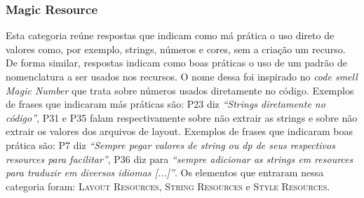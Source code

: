 \subsubsection{Magic Resource}

Esta categoria re\'une respostas que indicam como m\'a pr\'atica o uso direto de valores como, por exemplo, strings, números e cores, sem a criação um recurso. De forma similar, respostas indicam como boas pr\'aticas o uso de um padr\~ao de nomenclatura a ser usados nos recursos. O nome dessa foi inspirado no \textit{code smell} \textit{Magic Number} \cite{Martin:2008:CCH:1388398} que trata sobre números usados diretamente no código. Exemplos de frases que indicaram m\'as pr\'aticas s\~ao: P23 diz \textit{``Strings diretamente no código''}, P31 e P35 falam respectivamente sobre não extrair as strings e sobre não extrair os valores dos arquivos de layout. Exemplos de frases que indicaram boas pr\'atica s\~ao: P7 diz \textit{``Sempre pegar valores de string ou dp de seus respectivos resources para facilitar''}, P36 diz para \textit{``sempre adicionar as strings em resources para traduzir em diversos idiomas [...]''}. Os elementos que entraram nessa categoria foram: \textsc{Layout Resources}, \textsc{String Resources} e \textsc{Style Resources}. 













